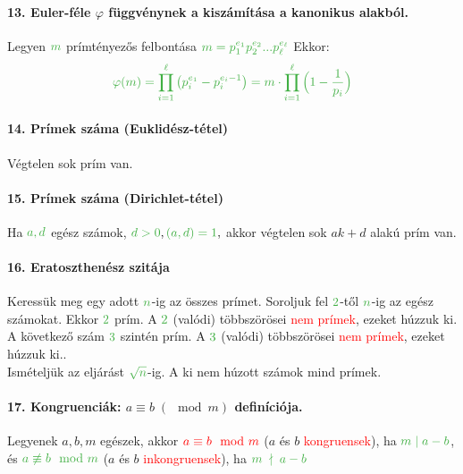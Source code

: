 \documentclass[10pt,a4paper]{article}
\renewcommand{\>}{\rightarrow}
\newcommand{\mmod}[2]{#1  \mid #2}
\newcommand{\n}{\gr{n}}
\newcommand{\red}[1]{\textcolor{red}{#1}}
\newcommand{\gr}[1]{\textcolor{FancsaliGreen}{#1}}
\newenvironment{m}
    {\begin{center}
    \begin{mdframed}[backgroundcolor=FancsaliBlue]
    }
    { 
    \end{mdframed}
    \end{center}
    }
\begin{document}
\paragraph{13. Euler-féle $\varphi$ függvénynek a kiszámítása a kanonikus alakból.}
\begin{m}
Legyen $\gr{m}$ prímtényezős felbontása $\gr{m=p_1^{e_1}p_2^{e_2}...p_\ell^{e_\ell}}$ Ekkor:
\[
\gr{\varphi (m) = \prod\limits_{i=1}^\ell \big(p_i^{e_1}-p_i^{e_i -1}\big)= m\cdot \prod\limits_{i=1}^\ell \Big(1-\frac{1}{p_i}\Big) }
\]
\end{m}
\paragraph{14. Prímek száma (Euklidész-tétel)}
\begin{m}
Végtelen sok prím van.
\end{m}
\paragraph{15. Prímek száma (Dirichlet-tétel)}
\begin{m}
Ha $\gr{a,d}$ egész számok, $\gr{d>0}, \gr{(a,d)=1},$ akkor végtelen sok $ak+d$ alakú prím van. 
\end{m}
\paragraph{16. Eratoszthenész szitája}
\begin{m}
Keressük meg egy adott $\n$-ig az összes prímet. Soroljuk fel $\gr{2}$-től $\n$-ig az egész számokat. Ekkor $\gr{2}$ prím. A $\gr{2}$ (valódi) többszörösei \red{nem prímek}, ezeket húzzuk ki. A következő szám $\gr{3}$ szintén prím. A $\gr{3}$ (valódi) többszörösei \red{nem prímek}, ezeket húzzuk ki.. \\
Ismételjük az eljárást $\gr{\sqrt{n}}$-ig. A ki nem húzott számok mind prímek.
\end{m}
\paragraph{17. Kongruenciák: $a \equiv b \;(\mod m)$ definíciója.}
\begin{m}
Legyenek $a,b,m$ egészek, akkor $\red{a \equiv b \mod m}$ ($a$ és $b$	\red{kongruensek}), ha $\gr{ \mmod{m}{a}- b}$, és $\gr{a\not\equiv b \mod m}$  ($a$ és $b$ \red{inkongruensek}), ha $\gr{m \; \nmid \; a-b}$
\end{m}
\end{document}

